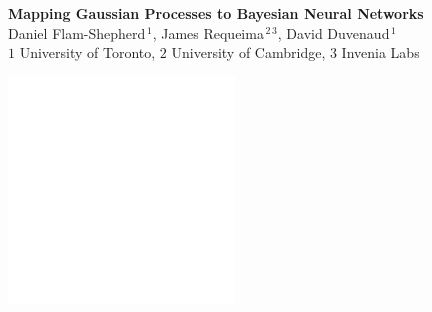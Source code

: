 \documentclass[landscape,a1,final,a4resizeable]{include/a0poster}
\begin{document}
\begin{minipage}[t][0pt]{\linewidth}
{{\begin{center}
   \huge \textbf{Mapping Gaussian Processes to Bayesian Neural Networks}\vspace{3mm}\\
    \large Daniel Flam-Shepherd$^{\,1}$, James Requeima$^{\,2\,3}$, David Duvenaud$^{\,1}$\\
    \color{white}\large 
    $1$ University of Toronto, $2$ University of Cambridge, $3$ Invenia Labs
    \end{center}
  }%
\hspace{3cm}
\parbox{.05\textwidth}{  
  \begin{flushright}\vspace{0.5cm}\includegraphics[height=6cm]{badges/inv_labs}\hfill%
  \end{flushright}}
}%



\begin{poster}%
\vspace{0\baselineskip}%
\vspace*{0.7cm}%
\large%
\noindent%

\begin{multicols}{3}


\begin{minipage}[t][47.5cm][t]{.32\textwidth}



\end{minipage}
\end{multicols}
\end{poster}
\end{minipage}
\end{document}
